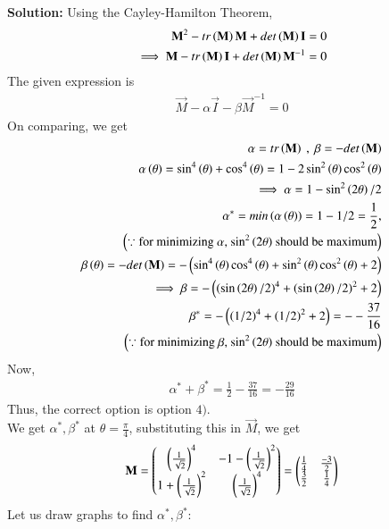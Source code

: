 \documentclass[journal,12pt,onecolumn]{IEEEtran}
\theoremstyle{remark}
\begin{document}
\textbf{Solution:}
Using the Cayley-Hamilton Theorem, 
\begin{align}
    \mathbf{M}^2 - tr\left(\mathbf{M}\right)\mathbf{M} + det\left(\mathbf{M}\right)\mathbf{I}=0\\
    \implies \mathbf{M} -tr\left(\mathbf{M}\right)\mathbf{I} + det\left(\mathbf{M}\right)\mathbf{M}^{-1} =0
\end{align}
The given expression is
\begin{align}
    \vec{M} -\alpha\vec{I} - \beta\vec{M}^{-1} =0
\end{align}
On comparing, we get
\begin{align}
    \alpha = tr\left(\mathbf{M}\right) \ , \ \beta = - det\left(\mathbf{M}\right)\\
    \alpha\left(\theta\right)=\sin^4\left(\theta\right)+\cos^4\left(\theta\right) = 1-2\sin^2\left(\theta\right)\cos^2\left(\theta\right)\\
    \implies \alpha = 1 -\sin^2\left(2\theta\right)/2 \\
    \alpha^*  = min\left(\alpha\left(\theta\right)\right)= 1- 1/2 = \frac{1}{2} ,\\ \left(\because \text{for minimizing $\alpha$,  $\sin^2\left(2\theta\right)$ should be maximum}\right)\nonumber\\
    \beta\left(\theta\right) = - det\left(\mathbf{M}\right) = - \left(\sin^4\left(\theta\right)\cos^4\left(\theta\right) + \sin^2\left(\theta\right)\cos^2\left(\theta\right) +2\right)\\
    \implies \beta = - \left( \left(\sin\left(2\theta\right)/2\right)^4 + \left(\sin\left(2\theta\right)/2\right)^2 + 2\right) \\
    \beta^* = - \left( \left(1/2\right)^4 + \left(1/2\right)^2 + 2\right)=--\frac{37}{16}\\
    \left(\because \text{for minimizing $\beta$,  $\sin^2\left(2\theta\right)$ should be maximum}\right)\nonumber
\end{align}
Now, 
\begin{align}
    \alpha^*+\beta^* = \frac{1}{2} - \frac{37}{16} = -\frac{29}{16}
\end{align}
Thus,  the correct option is option $4)$.\\
We get $\alpha^*, \beta^*$ at $\theta = \frac{\pi}{4}$, substituting this in $\vec{M}$, we get
\begin{align}
    \mathbf{M}=\begin{pmatrix}\left(\frac{1}{\sqrt{2}}\right)^ 4 & -1-\left(\frac{1}{\sqrt{2}}\right)^2 \\  1+\left(\frac{1}{\sqrt{2}}\right)^2 & \left(\frac{1}{\sqrt{2}}\right)^ 4\end{pmatrix} = \begin{pmatrix}\frac{1}{4} & \frac{-3}{2} \\ \frac{3}{2} &\frac{1}{4}\end{pmatrix}
\end{align}
Let us draw graphs to find $\alpha^*, \beta^*$:
\end{document}
